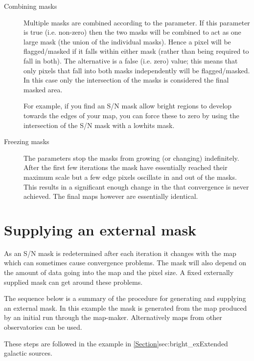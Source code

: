 \begin{description}
\item[Combining masks]
Multiple masks are combined according to the 
parameter. If this parameter is true (i.e. non-zero) then the two masks
will be combined to act as one large mask (the union of the individual
masks). Hence a pixel will be flagged/masked if it falls within either
mask (rather than being required to fall in both). The alternative is
a false (i.e. zero) value; this means that only pixels that fall into
both masks independently will be flagged/masked. In this case only the
intersection of the masks is considered the final masked area.

For example, if you find an S/N mask allow bright regions to develop
towards the edges of your map, you can force these to zero by using
the intersection of the S/N mask with a lowhits mask.

\item[Freezing masks]
The  parameters stop the masks from growing
(or changing) indefinitely. After the first few iterations the mask
have essentially reached their maximum scale but a few edge pixels
oscillate in and out of the masks. This results in a significant enough
change in the  that convergence is never achieved. The
final maps however are essentially identical.
\end{description}

\section{Supplying an external mask}
\label{sec:maskbe}

As an S/N mask is redetermined after each iteration it changes with the map
 which can sometimes cause convergence problems. The mask
will also depend on the amount of data going into the map and the
pixel size. A fixed externally supplied mask  can get around these problems.

The sequence below is a summary of the procedure for generating and
supplying an external mask. In this example the mask is generated from
the map produced by an initial run through the map-maker.
Alternatively maps from other observatories can be used.

These steps are followed in the example in
\cref{Section}{sec:bright_ex}{Extended galactic sources}.

